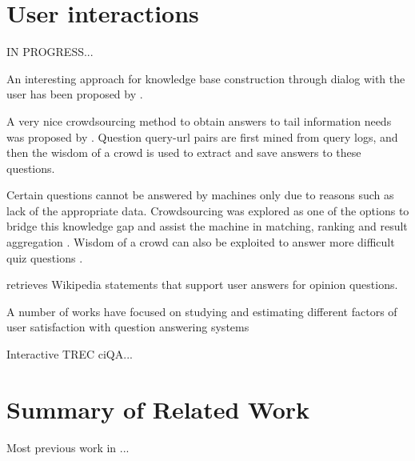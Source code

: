 \section{User interactions}

IN PROGRESS...

An interesting approach for knowledge base construction through dialog with the user has been proposed by \cite{hixon2015learning}.

A very nice crowdsourcing method to obtain answers to tail information needs was proposed by \cite{bernstein2012direct}.
Question query-url pairs are first mined from query logs, and then the wisdom of a crowd is used to extract and save answers to these questions.

Certain questions cannot be answered by machines only due to reasons such as lack of the appropriate data.
Crowdsourcing was explored as one of the options to bridge this knowledge gap and assist the machine in matching, ranking and result aggregation \cite{Franklin:2011:CAQ:1989323.1989331}.
Wisdom of a crowd can also be exploited to answer more difficult quiz questions \cite{aydin2014crowdsourcing}.

\cite{braunstain2016supporting} retrieves Wikipedia statements that support user answers for opinion questions.

A number of works have focused on studying and estimating different factors of user satisfaction with question answering systems \cite{ong2009measurement,Liu:2008:PIS:1390334.1390417}

Interactive TREC ciQA...

\section{Summary of Related Work}

Most previous work in ...

\clearpage